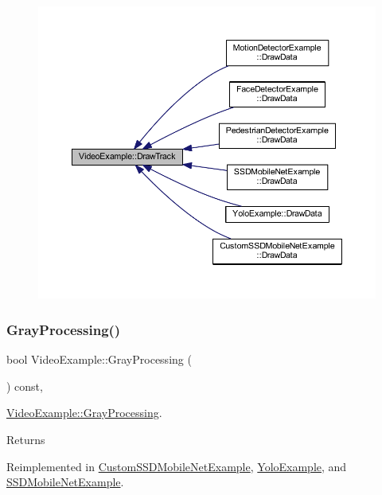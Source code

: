 \begin{figure}[H]
\begin{center}
\leavevmode
\includegraphics[width=350pt]{class_video_example_a84a040bc87b915c5ee18c5d11235f40c_icgraph}
\end{center}
\end{figure}
\mbox{\label{class_video_example_af8ea44f17711129d2b954d1f01fee1f0}} 
\subsubsection{\texorpdfstring{Gray\+Processing()}{GrayProcessing()}}
{\footnotesize\ttfamily bool Video\+Example\+::\+Gray\+Processing (\begin{DoxyParamCaption}{ }\end{DoxyParamCaption}) const\hspace{0.3cm}{\ttfamily [protected]}, {\ttfamily [virtual]}}



\mbox{\hyperlink{class_video_example_af8ea44f17711129d2b954d1f01fee1f0}{Video\+Example\+::\+Gray\+Processing}}. 

\begin{DoxyReturn}{Returns}

\end{DoxyReturn}


Reimplemented in \mbox{\hyperlink{class_custom_s_s_d_mobile_net_example_a4c3fe9ac68b5ef4f51d91a6322c5da02}{Custom\+S\+S\+D\+Mobile\+Net\+Example}}, \mbox{\hyperlink{class_yolo_example_aec0d91a32770f9a351d635c30ae54826}{Yolo\+Example}}, and \mbox{\hyperlink{class_s_s_d_mobile_net_example_a34d73a2badba0f9064506dbf276d5cbe}{S\+S\+D\+Mobile\+Net\+Example}}.



